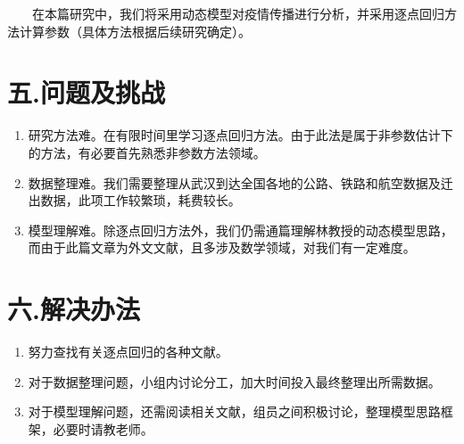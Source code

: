 \documentclass[
  12,
]{article}
\providecommand{\tightlist}{%
  \setlength{\itemsep}{0pt}\setlength{\parskip}{0pt}}
\begin{document}
  在本篇研究中，我们将采用动态模型对疫情传播进行分析，并采用逐点回归方法计算参数（具体方法根据后续研究确定）。

\hypertarget{ux4e94.ux95eeux9898ux53caux6311ux6218}{%
\section{五.问题及挑战}\label{ux4e94.ux95eeux9898ux53caux6311ux6218}}

\begin{enumerate}
\def\labelenumi{\arabic{enumi}.}
\tightlist
\item
  研究方法难。在有限时间里学习逐点回归方法。由于此法是属于非参数估计下的方法，有必要首先熟悉非参数方法领域。
\item
  数据整理难。我们需要整理从武汉到达全国各地的公路、铁路和航空数据及迁出数据，此项工作较繁琐，耗费较长。
\item
  模型理解难。除逐点回归方法外，我们仍需通篇理解林教授的动态模型思路，而由于此篇文章为外文文献，且多涉及数学领域，对我们有一定难度。
\end{enumerate}

\hypertarget{ux516d.ux89e3ux51b3ux529eux6cd5}{%
\section{六.解决办法}\label{ux516d.ux89e3ux51b3ux529eux6cd5}}

\begin{enumerate}
\def\labelenumi{\arabic{enumi}.}
\tightlist
\item
  努力查找有关逐点回归的各种文献。
\item
  对于数据整理问题，小组内讨论分工，加大时间投入最终整理出所需数据。
\item
  对于模型理解问题，还需阅读相关文献，组员之间积极讨论，整理模型思路框架，必要时请教老师。
\end{enumerate}
\end{document}
